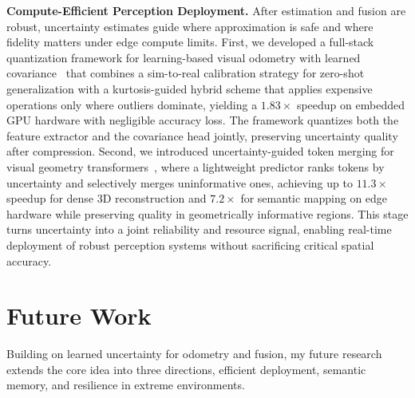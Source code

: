 \documentclass[conference]{IEEEtran}
\begin{document}
\medskip
\noindent\textbf{Compute-Efficient Perception Deployment.}
After estimation and fusion are robust, uncertainty estimates guide where approximation is safe and where fidelity matters under edge compute limits.
First, we developed a full-stack quantization framework for learning-based visual odometry with learned covariance~\cite{anonymous2026quantmacvo} that combines a sim-to-real calibration strategy for zero-shot generalization with a kurtosis-guided hybrid scheme that applies expensive operations only where outliers dominate, yielding a $1.83\times$ speedup on embedded GPU hardware with negligible accuracy loss.
The framework quantizes both the feature extractor and the covariance head jointly, preserving uncertainty quality after compression.
Second, we introduced uncertainty-guided token merging for visual geometry transformers~\cite{anonymous2026come}, where a lightweight predictor ranks tokens by uncertainty and selectively merges uninformative ones, achieving up to $11.3\times$ speedup for dense 3D reconstruction and $7.2\times$ for semantic mapping on edge hardware while preserving quality in geometrically informative regions.
This stage turns uncertainty into a joint reliability and resource signal, enabling real-time deployment of robust perception systems without sacrificing critical spatial accuracy.


\section{Future Work}

Building on learned uncertainty for odometry and fusion, my future research extends the core idea into three directions, efficient deployment, semantic memory, and resilience in extreme environments.
\end{document}
